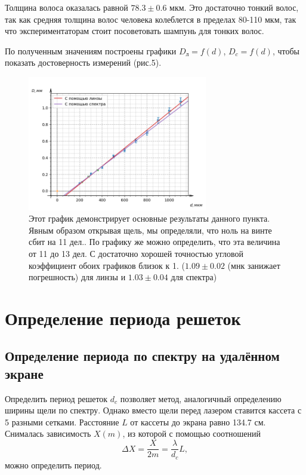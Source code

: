 \documentclass[a4paper, 14pt]{extarticle}%
\newcommand\ECaption[1]{%
     \captionsetup{font=footnotesize}%
     \caption{#1}}
\begin{document}
Толщина волоса оказалась равной $78.3\pm0.6$ мкм. Это достаточно тонкий волос, так как средняя толщина волос человека колеблется в пределах 80-110 мкм, так что экспериментаторам стоит посоветовать шампунь для тонких волос.

По полученным значениям построены графики $D_{\text{л}}=f(d)$, $D_c = f(d)$,  чтобы показать достоверность измерений (рис.5).
\newpage
\begin{figure}[h!]
\begin{center}
\includegraphics[width=0.7\textwidth]{gr2}
\ECaption{Этот график демонстрирует основные результаты данного пункта. Явным образом открывая щель, мы определяли, что ноль на винте сбит на 11 дел.. По графику же можно определить, что эта величина от 11 до 13 дел. С достаточно хорошей точностью угловой коэффициент обоих графиков близок к 1. ($1.09\pm 0.02$ (мнк занижает погрешность) для линзы и $1.03\pm 0.04$ для спектра)}
\end{center}
\end{figure}

\section*{Определение периода решеток}
\subsection*{Определение периода по спектру на удалённом экране}

Определить период решеток $d_c$ позволяет метод, аналогичный определению ширины щели по спектру. Однако вместо щели перед лазером ставится кассета с 5 разными сетками. Расстояние $L$ от кассеты до экрана равно 134.7 см. Снималась зависимость $X(m)$, из которой с помощью соотношений
\[\Delta X = \frac{X}{2m} = \frac{\lambda}{d_c}L,\]
можно определить период.
\end{document}
